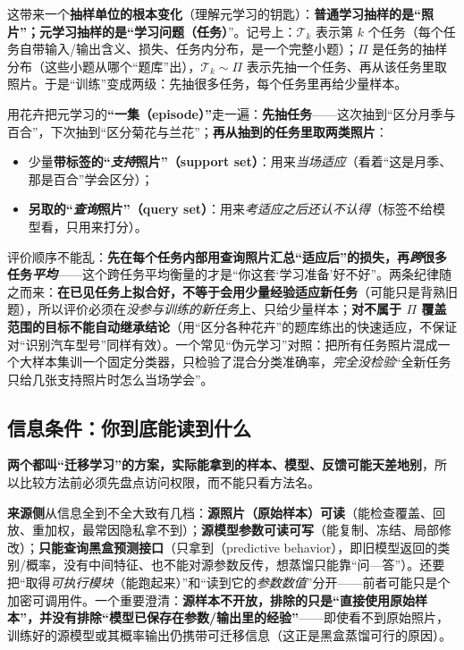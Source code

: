 这带来一个\textbf{抽样单位的根本变化}（理解元学习的钥匙）：\textbf{普通学习抽样的是“照片”；元学习抽样的是“学习问题（任务）}”。记号上：$\mathcal T_k$ 表示第 $k$ 个任务（每个任务自带输入/输出含义、损失、任务内分布，是一个完整小题）；$\Pi$ 是任务的抽样分布（这些小题从哪个“题库”出），$\mathcal T_k\sim\Pi$ 表示先抽一个任务、再从该任务里取照片。于是“训练”变成两级：先抽很多任务，每个任务里再给少量样本。

用花卉把元学习的\textbf{“一集（episode）”}走一遍：\textbf{先抽任务}——这次抽到“区分月季与百合”，下次抽到“区分菊花与兰花”；\textbf{再从抽到的任务里取两类照片}：
\begin{itemize}\item 少量\textbf{带标签的“\emph{支持}照片”（support set）}：用来\emph{当场适应}（看着“这是月季、那是百合”学会区分）；\item \textbf{另取的“\emph{查询}照片”（query set）}：用来\emph{考适应之后还认不认得}（标签不给模型看，只用来打分）。\end{itemize}
评价顺序不能乱：\textbf{先在每个任务内部用查询照片汇总“适应后”的损失，再\emph{跨}很多任务\emph{平均}}——这个跨任务平均衡量的才是“你这套‘学习准备’好不好”。两条纪律随之而来：\textbf{在已见任务上拟合好，不等于会用少量经验适应新任务}（可能只是背熟旧题），所以评价必须在\emph{没参与训练的新任务}上、只给少量样本；\textbf{对不属于 $\Pi$ 覆盖范围的目标不能自动继承结论}（用“区分各种花卉”的题库练出的快速适应，不保证对“识别汽车型号”同样有效）。一个常见“伪元学习”对照：把所有任务照片混成一个大样本集训一个固定分类器，只检验了混合分类准确率，\emph{完全没检验}“全新任务只给几张支持照片时怎么当场学会”。

\subsection{信息条件：你到底能读到什么}
\label{sec:kts-overview-information}

\textbf{两个都叫“迁移学习”的方案，实际能拿到的样本、模型、反馈可能天差地别}，所以比较方法前必须先盘点访问权限，而不能只看方法名。

\textbf{来源侧}从信息全到不全大致有几档：\textbf{源照片（原始样本）可读}（能检查覆盖、回放、重加权，最常因隐私拿不到）；\textbf{源模型参数可读可写}（能复制、冻结、局部修改）；\textbf{只能查询黑盒预测接口}（只拿到（predictive behavior），即旧模型返回的类别/概率，没有中间特征、也不能对源参数反传，想蒸馏只能靠“问—答”）。还要把“取得\emph{可执行模块}（能跑起来）”和“读到它的\emph{参数数值}”分开——前者可能只是个加密可调用件。一个重要澄清：\textbf{源样本不开放，排除的只是“直接使用原始样本”，并没有排除“模型已保存在参数/输出里的经验”}——即使看不到原始照片，训练好的源模型或其概率输出仍携带可迁移信息（这正是黑盒蒸馏可行的原因）。

